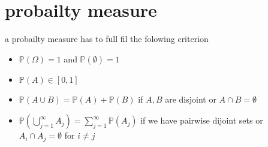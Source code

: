 \section{probailty measure}

a probailty measure has to full fil the folowing criterion 
\begin{itemize}
	\item $\mathbb{P}(\Omega) = 1$ and $\mathbb{P}(\emptyset) = 1$
	\item $\mathbb{P}(A) \in [0,1]$
	\item $\mathbb{P}(A \cup B) =\mathbb{P}(A) + \mathbb{P}(B) $ if $A, B$ are disjoint or $A\cap B = \emptyset$
	\item $\mathbb{P}(\bigcup_{j = 1}^{\infty} A_j) = \sum_{j=1}^{\infty} \mathbb{P}(A_j)$ if we have pairwise dijoint sets or $A_i \cap A_j = \emptyset$ for $i \neq j $
\end{itemize}